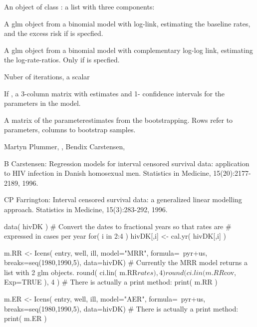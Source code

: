 \begin{Value}
An object of class : a list with three components:
\begin{ldescription}
\item[\code{rates}] A glm object from a binomial model with log-link,
estimating the baseline rates, and the excess risk if 
is specfied.
\item[\code{cov}] A glm object from a binomial model with complementary
log-log link, estimating the log-rate-ratios. Only if 
is specfied.
\item[\code{niter}] Nuber of iterations, a scalar
\item[\code{boot.ci}] If , a 3-column matrix with estimates
and 1- confidence intervals for the parameters in the model.
\item[\code{sample}] A matrix of the parameterestimates from the
bootstrapping. Rows refer to parameters, columns to bootstrap samples.
\end{ldescription}
\end{Value}
\begin{Author}\relax
Martyn Plummer, ,
Bendix Carstensen, 
\end{Author}
\begin{References}\relax
B Carstensen: Regression models for interval censored
survival data: application to HIV infection in Danish homosexual
men. Statistics in Medicine, 15(20):2177-2189, 1996.

CP Farrington: Interval censored survival data: a generalized linear
modelling approach. Statistics in Medicine, 15(3):283-292, 1996.
\end{References}
\begin{SeeAlso}\relax
{}
\end{SeeAlso}
\begin{Examples}
\begin{ExampleCode}
data( hivDK )
# Convert the dates to fractional years so that rates are
# expressed in cases per year
for( i in 2:4 ) hivDK[,i] <- cal.yr( hivDK[,i] )

m.RR <- Icens( entry, well, ill,
               model="MRR", formula=~pyr+us, breaks=seq(1980,1990,5),
               data=hivDK)
# Currently the MRR model returns a list with 2 glm objects.
round( ci.lin( m.RR$rates ), 4 )
round( ci.lin( m.RR$cov, Exp=TRUE ), 4 )
# There is actually a print method:
print( m.RR )

m.ER <- Icens( entry, well, ill,
               model="AER", formula=~pyr+us, breaks=seq(1980,1990,5),
               data=hivDK)
# There is actually a print method:
print( m.ER )
  \end{ExampleCode}
\end{Examples}

